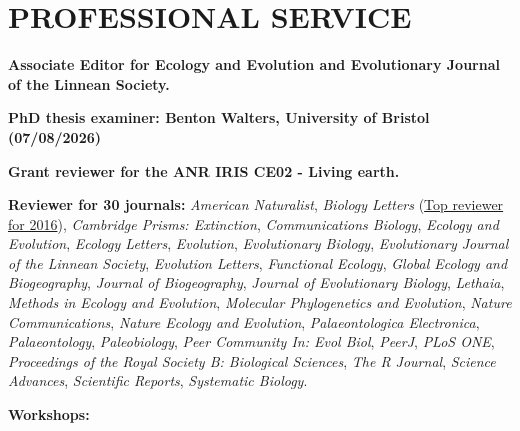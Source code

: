 \documentclass[10pt,a4paper]{article}
\begin{document}
{\bigskip

\bigskip


\section{PROFESSIONAL SERVICE}

\raggedright\textbf{Associate Editor for Ecology and Evolution and Evolutionary Journal of the Linnean Society.}

\raggedright\textbf{PhD thesis examiner: Benton Walters, University of Bristol (07/08/2026)}

\raggedright\textbf{Grant reviewer for the ANR IRIS CE02 - Living earth.}

\raggedright\textbf{Reviewer for 30 journals:} %
\textit{American Naturalist},
\textit{Biology Letters} (\href{http://blogs.royalsociety.org/publishing/biology-letters-top-reviewers-from-2016/}{Top reviewer for 2016}),
\textit{Cambridge Prisms: Extinction},
\textit{Communications Biology},
\textit{Ecology and Evolution},
\textit{Ecology Letters},
\textit{Evolution},
\textit{Evolutionary Biology},
\textit{Evolutionary Journal of the Linnean Society},
\textit{Evolution Letters},
\textit{Functional Ecology},
\textit{Global Ecology and Biogeography},
\textit{Journal of Biogeography},
\textit{Journal of Evolutionary Biology},
\textit{Lethaia},
\textit{Methods in Ecology and Evolution},
\textit{Molecular Phylogenetics and Evolution},
\textit{Nature Communications},
\textit{Nature Ecology and Evolution},
\textit{Palaeontologica Electronica},
\textit{Palaeontology},
\textit{Paleobiology},
\textit{Peer Community In: Evol Biol},
\textit{PeerJ},
\textit{PLoS ONE},
\textit{Proceedings of the Royal Society B: Biological Sciences},
\textit{The R Journal},
\textit{Science Advances},
\textit{Scientific Reports},
\textit{Systematic Biology}.

\bigskip
\raggedright\textbf{Workshops:}

}
\end{document}
